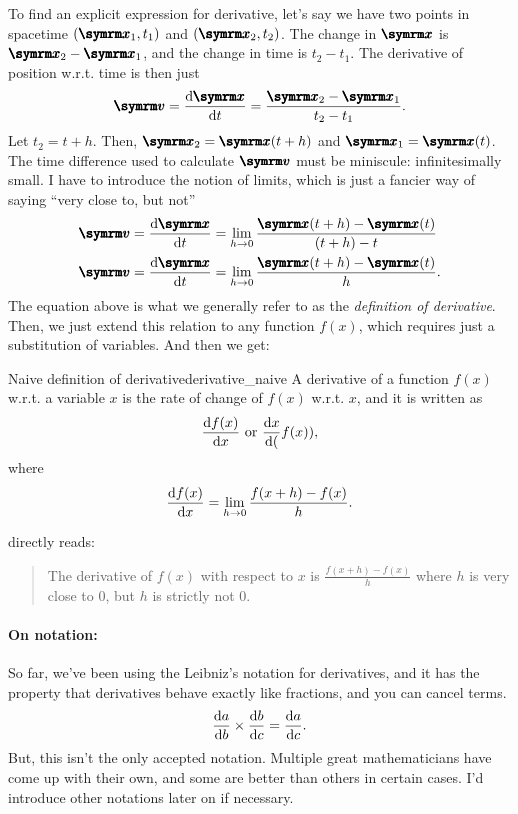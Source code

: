 To find an explicit expression for derivative, let's say we have two points in spacetime $(\vv{x}_1, t_1)$ and $(\vv{x}_2, t_2)$. The change in $\vv{x}$ is $\vv{x}_2 - \vv{x}_1$, and the change in time is $t_2 - t_1$. The derivative of position w.r.t. time is then just
\begin{equation}
    \vv{v} = \odv{\vv{x}}{t} = \frac{\vv{x}_2 - \vv{x}_1}{t_2 - t_1}. \label{eq:derivative1}
\end{equation}
Let $t_2 = t + h$. Then, $\vv{x}_2 = \vv{x}(t + h)$ and $\vv{x}_1 = \vv{x}(t)$. The time difference used to calculate $\vv{v}$ must be miniscule: infinitesimally small. I have to introduce the notion of limits, which is just a fancier way of saying ``very close to, but not''
\begin{align}
    \vv{v} = \odv{\vv{x}}{t} &= \lim_{h \appr 0}\frac{\vv{x}(t + h) - \vv{x}(t)}{(t + h) - t} \\
    \vv{v} = \odv{\vv{x}}{t} &= \lim_{h \appr 0}\frac{\vv{x}(t + h) - \vv{x}(t)}{h}.
\end{align}
The equation above is what we generally refer to as the \emph{definition of derivative}. Then, we just extend this relation to any function $f(x)$, which requires just a substitution of variables. And then we get:
\begin{df}{Naive definition of derivative}{derivative_naive}
    A derivative of a function $f(x)$ w.r.t. a variable $x$ is the rate of change of $f(x)$ w.r.t. $x$, and it is written as
    \begin{equation}
        \odv{f(x)}{x}~\textrm{or}~\odv{x}(f(x)),
    \end{equation}
    where
    \begin{equation}
        \odv{f(x)}{x} = \lim_{h \appr 0}\frac{f(x + h) - f(x)}{h}.\label{eq:naive_definition_of_derivative}
    \end{equation}
\end{df}
 directly reads:
\begin{quote}
    The derivative of $f(x)$ with respect to $x$ is $\frac{f(x + h) - f(x)}{h}$ where $h$ is very close to $0$, but $h$ is strictly not $0$.
\end{quote}

\paragraph{On notation:} So far, we've been using the Leibniz's notation for derivatives, and it has the property that derivatives behave exactly like fractions, and you can cancel terms.
\begin{equation}
    \odv{a}{b}\times\odv{b}{c} = \odv{a}{c}.\label{eq:prechainrule}
\end{equation}
But, this isn't the only accepted notation. Multiple great mathematicians have come up with their own, and some are better than others in certain cases. I'd introduce other notations later on if necessary.

